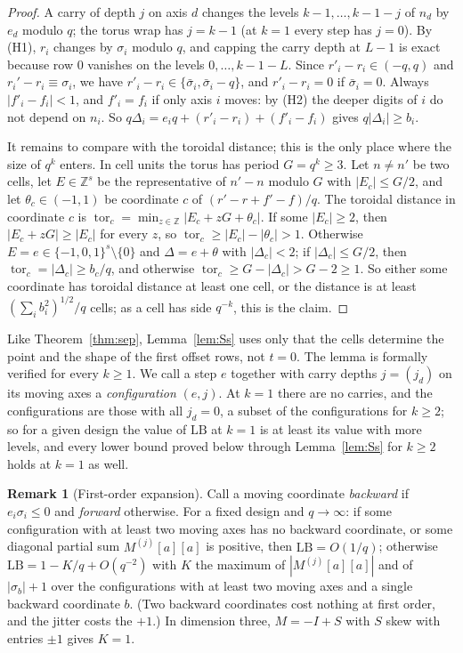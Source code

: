 \documentclass[11pt]{amsart}
\theoremstyle{definition}
\newtheorem{remark}[theorem]{Remark}
\theoremstyle{plain}
\newcommand{\Z}{\mathbb{Z}}
\begin{document}
\begin{proof}
A carry of depth $j$ on axis $d$ changes the levels $k-1,\dots,k-1-j$ of $n_d$ by $e_d$ modulo $q$; the torus wrap has $j=k-1$ (at $k=1$ every step has $j=0$). By (H1), $r_i$ changes by $\sigma_i$ modulo $q$, and capping the carry depth at $L-1$ is exact because row $0$ vanishes on the levels $0,\dots,k-1-L$. Since $r'_i-r_i\in(-q,q)$ and $r_i'-r_i\equiv\sigma_i$, we have $r'_i-r_i\in\{\bar\sigma_i,\bar\sigma_i-q\}$, and $r'_i-r_i=0$ if $\bar\sigma_i=0$. Always $|f'_i-f_i|<1$, and $f'_i=f_i$ if only axis $i$ moves: by (H2) the deeper digits of $i$ do not depend on $n_i$. So $q\Delta_i=e_iq+(r'_i-r_i)+(f'_i-f_i)$ gives $q|\Delta_i|\ge b_i$.

It remains to compare with the toroidal distance; this is the only place where the size of $q^k$ enters. In cell units the torus has period $G=q^k\ge3$. Let $n\ne n'$ be two cells, let $E\in\Z^s$ be the representative of $n'-n$ modulo $G$ with $|E_c|\le G/2$, and let $\theta_c\in(-1,1)$ be coordinate $c$ of $(r'-r+f'-f)/q$. The toroidal distance in coordinate $c$ is $\operatorname{tor}_c=\min_{z\in\Z}|E_c+zG+\theta_c|$. If some $|E_c|\ge2$, then $|E_c+zG|\ge|E_c|$ for every $z$, so $\operatorname{tor}_c\ge|E_c|-|\theta_c|>1$. Otherwise $E=e\in\{-1,0,1\}^s\setminus\{0\}$ and $\Delta=e+\theta$ with $|\Delta_c|<2$; if $|\Delta_c|\le G/2$, then $\operatorname{tor}_c=|\Delta_c|\ge b_c/q$, and otherwise $\operatorname{tor}_c\ge G-|\Delta_c|>G-2\ge1$. So either some coordinate has toroidal distance at least one cell, or the distance is at least $(\sum_ib_i^2)^{1/2}/q$ cells; as a cell has side $q^{-k}$, this is the claim.
\end{proof}

Like Theorem~\ref{thm:sep}, Lemma~\ref{lem:Ss} uses only that the cells determine the point and the shape of the first offset rows, not $t=0$. The lemma is formally verified for every $k\ge1$. We call a step $e$ together with carry depths $j=(j_d)$ on its moving axes a \emph{configuration} $(e,j)$. At $k=1$ there are no carries, and the configurations are those with all $j_d=0$, a subset of the configurations for $k\ge2$; so for a given design the value of $\mathrm{LB}$ at $k=1$ is at least its value with more levels, and every lower bound proved below through Lemma~\ref{lem:Ss} for $k\ge2$ holds at $k=1$ as well.

\begin{remark}[First-order expansion]\label{rem:K}
Call a moving coordinate \emph{backward} if $e_i\sigma_i\le0$ and \emph{forward} otherwise. For a fixed design and $q\to\infty$: if some configuration with at least two moving axes has no backward coordinate, or some diagonal partial sum $M^{(j)}[a][a]$ is positive, then $\mathrm{LB}=O(1/q)$; otherwise $\mathrm{LB}=1-K/q+O(q^{-2})$ with $K$ the maximum of $|M^{(j)}[a][a]|$ and of $|\sigma_b|+1$ over the configurations with at least two moving axes and a single backward coordinate $b$. (Two backward coordinates cost nothing at first order, and the jitter costs the $+1$.) In dimension three, $M=-I+S$ with $S$ skew with entries $\pm1$ gives $K=1$.
\end{remark}
\end{document}
